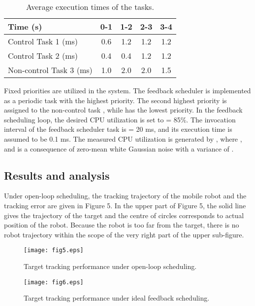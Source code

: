\documentclass[12pt,a4paper]{ijicic}
\begin{document}
\begin{table}[htb!]
\begin{center}
\caption{Average execution times of the tasks.}
\label{table3}
\begin{tabular}{lcccc}
\hline
Time (s) & 0-1 & 1-2 & 2-3 & 3-4 \\
\hline
Control Task 1 (ms) & 0.6 & 1.2 & 1.2 & 1.2 \\
Control Task 2 (ms) & 0.4 & 0.4 & 1.2 & 1.2 \\
Non-control Task 3 (ms) & 1.0 & 2.0 & 2.0 & 1.5 \\
\hline
\end{tabular}
\end{center}
\end{table}

Fixed priorities are utilized in the system. The feedback scheduler is
implemented as a periodic task with the highest priority. The second
highest priority is assigned to the non-control task , while 
has the lowest priority. In the feedback scheduling loop, the desired CPU
utilization is set to  = 85\%. The invocation interval of the feedback
scheduler task is  = 20 ms, and its execution time is assumed to be 0.1 ms.
The measured CPU utilization is generated by ,
where , and  is a consequence of zero-mean white
Gaussian noise with a variance of .

\subsection{Results and analysis}
Under open-loop scheduling, the tracking trajectory of the mobile
robot and the tracking error are given in Figure 5. In the upper
part of Figure 5, the solid line gives the trajectory of the target
and the centre of circles corresponds to actual position of the
robot. Because the robot is too far from the target, there is no
robot trajectory within the scope of the very right part of the
upper sub-figure.

\begin{figure}[htb!]
\begin{minipage}[t]{0.47\textwidth} \centering
\texttt{[image: fig5.eps]}
\caption{Target tracking performance under open-loop scheduling.}
\label{fig:5}
\end{minipage}\begin{minipage}[t]{0.47\textwidth}
\texttt{[image: fig6.eps]}
\caption{Target tracking performance under ideal feedback scheduling.}
\label{fig:6}
\end{minipage}
\end{figure}
\end{document}
